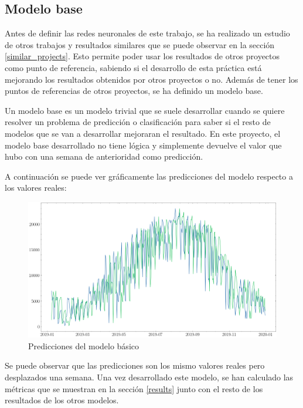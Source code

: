 \subsection{Modelo base}\label{baseline_model}
Antes de definir las redes neuronales de este trabajo, se ha realizado un estudio de otros trabajos y resultados similares que se puede observar en la sección \ref{similar_projects}. Esto permite poder usar los resultados de otros proyectos como punto de referencia, sabiendo si el desarrollo de esta práctica está mejorando los resultados obtenidos por otros proyectos o no. Además de tener los puntos de referencias de otros proyectos, se ha definido un modelo base.
\newline

Un modelo base es un modelo trivial que se suele desarrollar cuando se quiere resolver un problema de predicción o clasificación para saber si el resto de modelos que se van a desarrollar mejoraran el resultado. En este proyecto, el modelo base desarrollado no tiene lógica y simplemente devuelve el valor que hubo con una semana de anterioridad como predicción.  
\newline

A continuación se puede ver gráficamente las predicciones del modelo respecto a los valores reales:
\begin{figure}[H]
    \centering
    \includegraphics[width=16cm]{images/solution/predictions/baseline-predictions.png}
    \caption{Predicciones del modelo básico}
    \label{fig:baseline-predictions}
\end{figure}

Se puede observar que las predicciones son los mismo valores reales pero desplazados una semana. Una vez desarrollado este modelo, se han calculado las métricas que se muestran en la sección \ref{results} junto con el resto de los resultados de los otros modelos.
